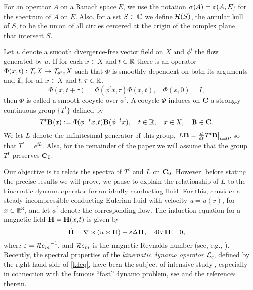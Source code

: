 For an operator $A$ on a Banach space $E$, we use
the notation $\sigma(A)=\sigma(A,E)$ for the spectrum
of $A$ on $E$. Also, for a set $S\subset {\Bbb{C}}$ 
we define ${\cal{H}}(S)$,  the annular hull
of $S$, to be the union of all circles centered at the origin of the
complex plane that intersect $S$.


Let $u$ denote a smooth  divergence-free vector field on $X$ and
$\phi^t$ the flow generated by $u$.
If for each $x\in X$ and $t\in {\Bbb{R}}$ there is an operator 
$\Phi(x,t):{\cal{T}}_xX\to{\cal{T}}_{\phi^tx}X$ such that
$\Phi$ is smoothly dependent on both its arguments and if,
for all $x\in X$ and
$t,\tau\in {\Bbb{R}}$, 
\[
\Phi(x,t+\tau)=\Phi(\phi^tx,\tau)\Phi(x,t),\quad
\Phi(x,0)=I, 
\]
then $\Phi$ is called a smooth cocycle over $\phi^t$.
A cocycle $\Phi$ induces on ${\bold C}$ a strongly continuous group 
$\{T^t\}$ defined by
\begin{equation}\lb{defTt}
T^t\bB(x):=\Phi(\phi^{-t}x,t)\bB(\phi^{-t}x), 
\quad t\in\bbR, \quad x\in X, \quad \bB\in\bC.
\end{equation}
We let $L$ denote the infinitesimal generator of this group,
$\left.L{\bold B}=\frac{d}{dt}T^t{\bold B}\right|_{t=0}$, so that
$T^t=e^{tL}$. Also, for the remainder of the paper we
will assume that the group $T^t$
preserves ${{\bold C}_0}$. 

Our objective is to relate the spectra of 
$T^t$ and $L$ on ${{\bold C}_0}$.
However, before stating the precise results we will prove,
we pause to explain the relationship of $L$ to the 
kinematic dynamo operator for an ideally conducting fluid.
For this, consider a steady incompressible conducting
Eulerian fluid with velocity $u=u(x)$,
for $x\in {\Bbb{R}}^3$, and let $\phi^t$ denote the corresponding flow.
The induction equation for 
a magnetic field ${{\bold H}}={\bold H}(x,t)$ is given by
\begin{equation}\lb{kdeq}
 \dot{\bH} = \nabla\times (u\times {\bH}) + 
                   \varepsilon \Delta {\bH},\quad
 \div{\bH}  = 0,
\end{equation}
where $\varepsilon= {{\cal R}e_m}^{-1}$, and ${\cal R}e_m$ is the
magnetic Reynolds number (see, e.g., \cite[Ch.~6]{Moffatt}).
Recently, the spectral properties of the {\em kinematic dynamo operator}
${\cal{L}}_\varepsilon$, defined by the right hand side of \eqref{kdeq}, 
have been the subject of
intensive study \cite{Rafael,KY,Nunez,Vishik},  
especially in connection with
the famous ``fast'' dynamo problem, see
\cite{Arnold,AZRS,BC,FV,Vishik}
and the references therein.
 
